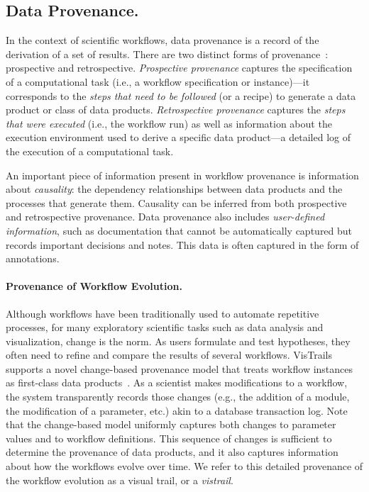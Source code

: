 \documentclass[12pt]{iopart}
\makeatletter
\newcommand{\eg}{e.g.,\xspace}
\newcommand{\ie}{i.e.,\xspace}
\newcommand{\etc}{etc.\@\xspace}
\makeatother
\begin{document}
\subsection{Data Provenance.}
In the context of scientific workflows, data provenance is a record of
the derivation of a set of results.  There are two distinct forms of
provenance~\cite{VDL:Challenge06}: prospective and retrospective.
\emph{Prospective provenance} captures the specification of a
computational task (\ie a workflow specification or instance)---it
corresponds to the \emph{steps that need to be followed} (or a recipe)
to generate a data product or class of data products.
\emph{Retrospective provenance} captures the \emph{steps that were
  executed} (\ie the workflow run) as well as information about the
execution environment used to derive a specific data product---a
detailed log of the execution of a computational task.

An important piece of information present in workflow provenance is
information about \emph{causality}: the dependency relationships
between data products and the processes that generate them.  Causality
can be inferred from both prospective and retrospective provenance.
Data provenance also includes \emph{user-defined information}, such as
documentation that cannot be automatically captured but records
important decisions and notes.  This data is often captured in the
form of annotations.

\paragraph{Provenance of Workflow Evolution.}
%
Although workflows have been traditionally used to automate repetitive
processes, for many exploratory scientific tasks such as data analysis
and visualization, change is the norm. As users formulate and test
hypotheses, they often need to refine and compare the results of
several workflows. VisTrails~\cite{vistrails} supports a novel
change-based provenance model that treats workflow instances as
first-class data
products~\cite{Freire:2006:IPAW,callahan@sciflow2006}.  As a scientist
makes modifications to a workflow, the system transparently records
those changes (\eg the addition of a module, the modification of a
parameter, \etc) akin to a database transaction log. Note that the
change-based model uniformly captures both changes to parameter values
and to workflow definitions. This sequence of changes is sufficient to
determine the provenance of data products, and it also captures
information about how the workflows evolve over time.  We refer to
this detailed provenance of the workflow evolution as a visual trail,
or a \emph{vistrail}.
\end{document}
